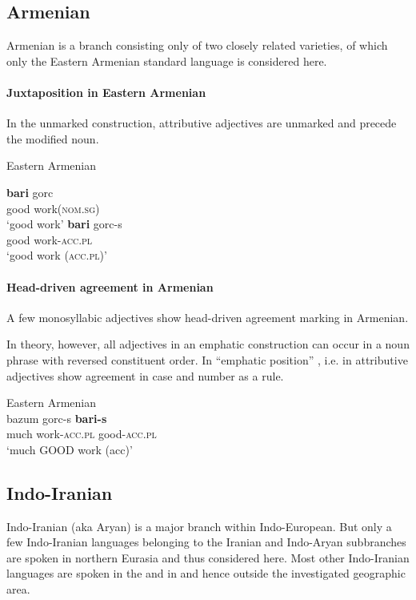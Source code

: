 \subsection{Armenian}
Armenian is a branch consisting only of two closely related varieties, of which only the Eastern Armenian standard language is considered here.

\paragraph*{Juxtaposition in Eastern Armenian} 
In the unmarked construction, attributive adjectives are unmarked and precede the modified noun.
\begin{exe}
\ex \rm{Eastern Armenian \citep{ajello1998}}
\begin{xlist}
\ex 
\gll	\textbf{bari} gorc\\
	good work(\textsc{nom.sg})\\
\glt	‘good work’
\ex 
\gll	\textbf{bari} gorc-s\\
	good work-\textsc{acc.pl}\\
\glt	‘good work (\textsc{acc.pl})’
\end{xlist}
\end{exe}

\paragraph*{Head\hyp{}driven agreement in Armenian}
A few monosyllabic adjectives show head\hyp{}driven agreement marking in Armenian. 

In theory, however, all adjectives in an emphatic construction can occur in a noun phrase with reversed constituent order. In “emphatic position” \cite[224]{ajello1998}, i.e. in  attributive adjectives show agreement in case and number as a rule.
\begin{exe}
\ex \rm{Eastern Armenian \citep[224]{ajello1998}}\\
\gll	bazum gorc-s \textbf{bari-s}\\
	much work-\textsc{acc.pl} good-\textsc{acc.pl}\\
\glt	‘much GOOD work (acc)’
\end{exe}

\subsection{Indo-Iranian}
Indo-Iranian (aka Aryan) is a major branch within Indo-European. But only a few Indo-Iranian languages belonging to the Iranian and Indo-Aryan subbranches are spoken in northern Eurasia and thus considered here. Most other Indo-Iranian languages are spoken in the  and in  and hence outside the investigated geographic area. 

